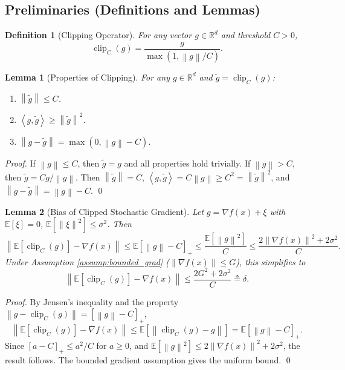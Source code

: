 \documentclass{article}
\newtheorem{lemma}{Lemma}
\newtheorem{definition}{Definition}
\newcommand{\R}{\mathbb{R}}
\newcommand{\E}{\mathbb{E}}
\newcommand{\norm}[1]{\left\| #1 \right\|}
\newcommand{\inner}[2]{\left\langle #1, #2 \right\rangle}
\newcommand{\clip}[2]{\operatorname{clip}_{#1}(#2)}
\begin{document}
\subsection*{Preliminaries (Definitions and Lemmas)}

\begin{definition}[Clipping Operator]
    For any vector $g \in \R^d$ and threshold $C > 0$,
    \[
        \clip{C}{g} = \frac{g}{\max(1, \norm{g}/C)}.
    \]
\end{definition}

\begin{lemma}[Properties of Clipping] \label{lem:clip}
    For any $g \in \R^d$ and $\tilde{g} = \clip{C}{g}$:
    \begin{enumerate}
        \item $\norm{\tilde{g}} \le C$.
        \item $\inner{g}{\tilde{g}} \ge \norm{\tilde{g}}^2$.
        \item $\norm{g - \tilde{g}} = \max(0, \norm{g} - C)$.
    \end{enumerate}
\end{lemma}
\begin{proof}
    If $\norm{g} \le C$, then $\tilde{g}=g$ and all properties hold trivially. If $\norm{g} > C$, then $\tilde{g} = C g / \norm{g}$. Then $\norm{\tilde{g}} = C$, $\inner{g}{\tilde{g}} = C \norm{g} \ge C^2 = \norm{\tilde{g}}^2$, and $\norm{g-\tilde{g}} = \norm{g} - C$. \qed
\end{proof}

\begin{lemma}[Bias of Clipped Stochastic Gradient] \label{lem:clip_bias}
    Let $g = \nabla f(x) + \xi$ with $\E[\xi]=0$, $\E[\norm{\xi}^2] \le \sigma^2$. Then
    \[
        \norm{\E[\clip{C}{g}] - \nabla f(x)} \le \E[\norm{g} - C]_+ \le \frac{\E[\norm{g}^2]}{C} \le \frac{2\norm{\nabla f(x)}^2 + 2\sigma^2}{C}.
    \]
    Under Assumption \ref{assump:bounded_grad} ($\norm{\nabla f(x)} \le G$), this simplifies to
    \[
        \norm{\E[\clip{C}{g}] - \nabla f(x)} \le \frac{2G^2 + 2\sigma^2}{C} \triangleq \delta.
    \]
\end{lemma}
\begin{proof}
    By Jensen's inequality and the property $\norm{g - \clip{C}{g}} = [\norm{g}-C]_+$,
    \[
        \norm{\E[\clip{C}{g}] - \nabla f(x)} \le \E[\norm{\clip{C}{g} - g}] = \E[\norm{g}-C]_+.
    \]
    Since $[a-C]_+ \le a^2/C$ for $a \ge 0$, and $\E[\norm{g}^2] \le 2\norm{\nabla f(x)}^2 + 2\sigma^2$, the result follows. The bounded gradient assumption gives the uniform bound. \qed
\end{proof}
\end{document}
